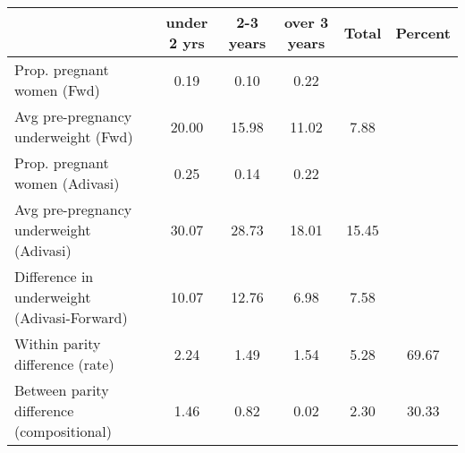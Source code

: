 \begin{tabular}{l*{5}{c}}
\toprule
            &\multicolumn{1}{c}{under 2 yrs}&\multicolumn{1}{c}{2-3 years}&\multicolumn{1}{c}{over 3 years}&\multicolumn{1}{c}{Total}&\multicolumn{1}{c}{Percent}\\
\midrule
\midrule
Prop. pregnant women (Fwd)&        0.19&        0.10&        0.22&            &            \\
Avg pre-pregnancy underweight (Fwd)&       20.00&       15.98&       11.02&        7.88&            \\
Prop. pregnant women (Adivasi)&        0.25&        0.14&        0.22&            &            \\
Avg pre-pregnancy underweight (Adivasi)&       30.07&       28.73&       18.01&       15.45&            \\
Difference in underweight (Adivasi-Forward)&       10.07&       12.76&        6.98&        7.58&            \\
Within parity difference (rate)&        2.24&        1.49&        1.54&        5.28&       69.67\\
Between parity difference (compositional)&        1.46&        0.82&        0.02&        2.30&       30.33\\
\bottomrule
\end{tabular}
